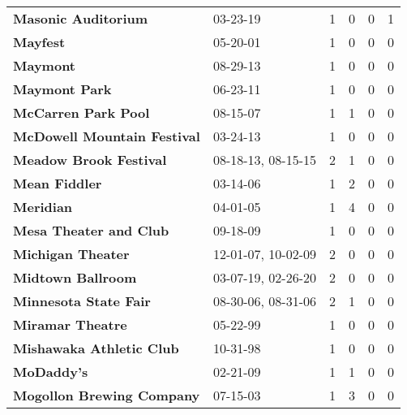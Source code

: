 \begin{supertabular}{p{0.4\textwidth}p{0.3\textwidth}p{0.05\textwidth}p{0.05\textwidth}p{0.05\textwidth}p{0.05\textwidth}}
                                          \textbf{Masonic Auditorium} &            03-23-19 &  1 &  0 &  0 &  1 \\
                                                     \textbf{Mayfest} &            05-20-01 &  1 &  0 &  0 &  0 \\
                                                     \textbf{Maymont} &            08-29-13 &  1 &  0 &  0 &  0 \\
                                                \textbf{Maymont Park} &            06-23-11 &  1 &  0 &  0 &  0 \\
                                          \textbf{McCarren Park Pool} &            08-15-07 &  1 &  1 &  0 &  0 \\
                                  \textbf{McDowell Mountain Festival} &            03-24-13 &  1 &  0 &  0 &  0 \\
                                       \textbf{Meadow Brook Festival} &  08-18-13, 08-15-15 &  2 &  1 &  0 &  0 \\
                                                \textbf{Mean Fiddler} &            03-14-06 &  1 &  2 &  0 &  0 \\
                                                    \textbf{Meridian} &            04-01-05 &  1 &  4 &  0 &  0 \\
                                       \textbf{Mesa Theater and Club} &            09-18-09 &  1 &  0 &  0 &  0 \\
                                            \textbf{Michigan Theater} &  12-01-07, 10-02-09 &  2 &  0 &  0 &  0 \\
                                            \textbf{Midtown Ballroom} &  03-07-19, 02-26-20 &  2 &  0 &  0 &  0 \\
                                        \textbf{Minnesota State Fair} &  08-30-06, 08-31-06 &  2 &  1 &  0 &  0 \\
                                             \textbf{Miramar Theatre} &            05-22-99 &  1 &  0 &  0 &  0 \\
                                     \textbf{Mishawaka Athletic Club} &            10-31-98 &  1 &  0 &  0 &  0 \\
                                                   \textbf{MoDaddy's} &            02-21-09 &  1 &  1 &  0 &  0 \\
                                    \textbf{Mogollon Brewing Company} &            07-15-03 &  1 &  3 &  0 &  0 \\

\end{supertabular}
